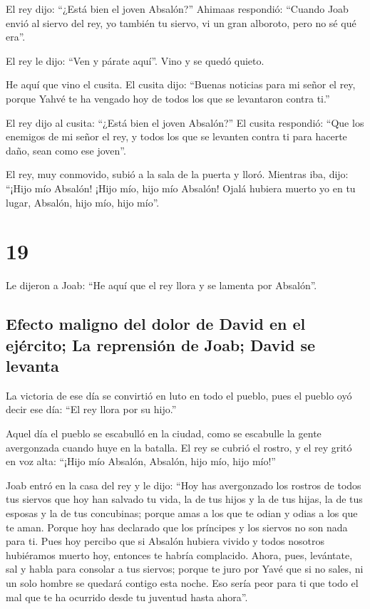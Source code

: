  El rey dijo: ``¿Está bien el joven Absalón?'' Ahimaas
respondió: ``Cuando Joab envió al siervo del rey, yo también tu siervo,
vi un gran alboroto, pero no sé qué era''.

 El rey le dijo: ``Ven y párate aquí''. Vino y se quedó
quieto.

 He aquí que vino el cusita. El cusita dijo: ``Buenas
noticias para mi señor el rey, porque Yahvé te ha vengado hoy de todos
los que se levantaron contra ti.''

 El rey dijo al cusita: ``¿Está bien el joven Absalón?''
El cusita respondió: ``Que los enemigos de mi señor el rey, y todos los
que se levanten contra ti para hacerte daño, sean como ese joven''.

 El rey, muy conmovido, subió a la sala de la puerta y
lloró. Mientras iba, dijo: ``¡Hijo mío Absalón! ¡Hijo mío, hijo mío
Absalón! Ojalá hubiera muerto yo en tu lugar, Absalón, hijo mío, hijo
mío''.

\hypertarget{section-18}{%
\section{19}\label{section-18}}

 Le dijeron a Joab: ``He aquí que el rey llora y se
lamenta por Absalón''.

\hypertarget{efecto-maligno-del-dolor-de-david-en-el-ejuxe9rcito-la-reprensiuxf3n-de-joab-david-se-levanta}{%
\subsection{Efecto maligno del dolor de David en el ejército; La
reprensión de Joab; David se
levanta}\label{efecto-maligno-del-dolor-de-david-en-el-ejuxe9rcito-la-reprensiuxf3n-de-joab-david-se-levanta}}

 La victoria de ese día se convirtió en luto en todo el
pueblo, pues el pueblo oyó decir ese día: ``El rey llora por su hijo.''

 Aquel día el pueblo se escabulló en la ciudad, como se
escabulle la gente avergonzada cuando huye en la batalla. 
El rey se cubrió el rostro, y el rey gritó en voz alta: ``¡Hijo mío
Absalón, Absalón, hijo mío, hijo mío!''

 Joab entró en la casa del rey y le dijo: ``Hoy has
avergonzado los rostros de todos tus siervos que hoy han salvado tu
vida, la de tus hijos y la de tus hijas, la de tus esposas y la de tus
concubinas;  porque amas a los que te odian y odias a los
que te aman. Porque hoy has declarado que los príncipes y los siervos no
son nada para ti. Pues hoy percibo que si Absalón hubiera vivido y todos
nosotros hubiéramos muerto hoy, entonces te habría complacido.
 Ahora, pues, levántate, sal y habla para consolar a tus
siervos; porque te juro por Yavé que si no sales, ni un solo hombre se
quedará contigo esta noche. Eso sería peor para ti que todo el mal que
te ha ocurrido desde tu juventud hasta ahora''.

